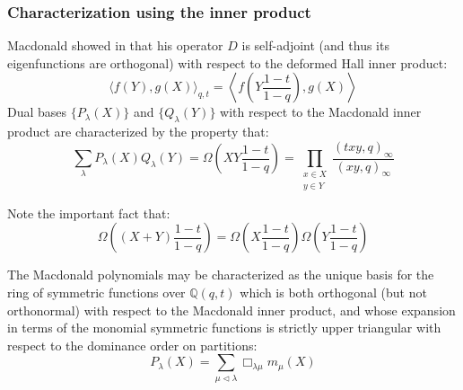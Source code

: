 \documentclass[12pt,dvips]{amsart}
\begin{document}


\subsubsection{Characterization using the inner product}
\noindent
Macdonald showed in \cite{MAC} that his operator $D$ is self-adjoint (and thus its eigenfunctions are orthogonal) with respect to the deformed Hall inner product:
$$ \langle f(Y), g(X) \rangle_{q,t} = \left \langle f \left( Y \frac{1-t}{1-q} \right ), g(X) \right \rangle $$
Dual bases $\{P_\lambda(X)\}$ and $\{Q_\lambda(Y)\}$ with respect to the Macdonald inner product are characterized by the property that:
$$ \sum_\lambda P_\lambda(X) Q_\lambda(Y) = \Omega \left(XY\frac{1-t}{1-q} \right) = \prod_{\substack{x \in X \\ y \in Y}} \frac{(txy,q)_\infty}{(xy,q)_\infty} $$

Note the important fact that:
$$ \Omega \left ( (X + Y) \frac{1-t}{1-q} \right ) = \Omega \left (X \frac{1-t}{1-q} \right ) \Omega \left ( Y \frac{1-t}{1-q} \right ) $$

The Macdonald polynomials may be characterized as the unique basis for the ring of symmetric functions over $\mathbb{Q}(q,t)$ which is both orthogonal (but not orthonormal) with respect to the Macdonald inner product, and whose expansion in terms of the monomial symmetric functions is strictly upper triangular with respect to the dominance order \cite{MAC} on partitions:
$$ P_\lambda(X) = \sum_{\mu \triangleleft \lambda} \Box_{\lambda \mu} m_\mu(X) $$

\end{document}
